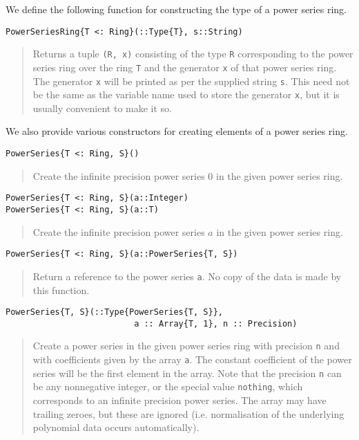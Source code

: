 \documentclass[a4paper,10pt]{article}
\newcommand{\code}{\lstinline}
\newcommand{\desc}[1]{\vspace{-3mm}\begin{quote}#1\end{quote}}
\begin{document}
{{{We define the following function for constructing the type of a power series
ring.

\begin{lstlisting}
PowerSeriesRing{T <: Ring}(::Type{T}, s::String)
\end{lstlisting}

\desc{Returns a tuple \code{(R, x)} consisting of the type \code{R} 
corresponding to the power series ring over the ring \code{T} and the generator
\code{x} of that power series ring. The generator \code{x} will be printed as
per the supplied string \code{s}. This need not be the same as the variable
name used to store the generator \code{x}, but it is usually convenient to make
it so.}

We also provide various constructors for creating elements of a power series
ring.

\begin{lstlisting}
PowerSeries{T <: Ring, S}()
\end{lstlisting}

\desc{Create the infinite precision power series $0$ in the given power series
ring.}

\begin{lstlisting}
PowerSeries{T <: Ring, S}(a::Integer)
PowerSeries{T <: Ring, S}(a::T)
\end{lstlisting}

\desc{Create the infinite precision power series $a$ in the given power series
ring.}

\begin{lstlisting}
PowerSeries{T <: Ring, S}(a::PowerSeries{T, S})
\end{lstlisting}

\desc{Return a reference to the power series \code{a}. No copy of the data is
made by this function.}

\begin{lstlisting}
PowerSeries{T, S}(::Type{PowerSeries{T, S}}, 
                          a :: Array{T, 1}, n :: Precision)
\end{lstlisting}

\desc{Create a power series in the given power series ring with precision
\code{n} and with coefficients given by the array \code{a}. The constant 
coefficient of the power series will be the first element in the array. Note
that the precision \code{n} can be any nonnegative integer, or the special
value \code{nothing}, which corresponds to an infinite precision power series.
The array may have trailing zeroes, but these are ignored (i.e. normalisation
of the underlying polynomial data occurs automatically).}

}}}
\end{document}
